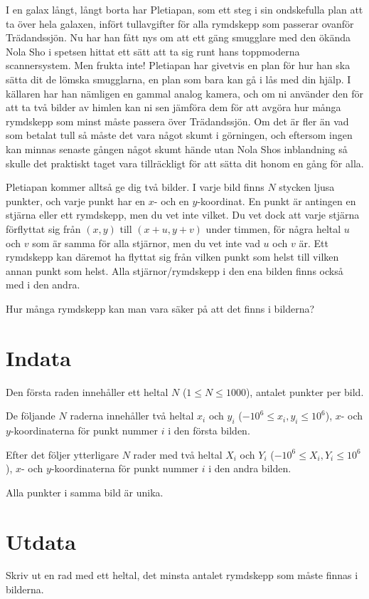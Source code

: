 I en galax långt, långt borta har Pletiapan, som ett steg i sin ondskefulla plan att ta över hela galaxen, infört tullavgifter för alla rymdskepp som passerar ovanför Trädandssjön.
Nu har han fått nys om att ett gäng smugglare med den ökända Nola Sho i spetsen hittat ett sätt att ta sig runt hans toppmoderna scannersystem.
Men frukta inte! Pletiapan har givetvis en plan för hur han ska sätta dit de lömska smugglarna, en plan som bara kan gå i lås med din hjälp.
I källaren har han nämligen en gammal analog kamera, och om ni använder den för att ta två bilder av himlen kan ni sen jämföra dem för att avgöra hur många rymdskepp som minst måste passera över Trädandssjön.
Om det är fler än vad som betalat tull så måste det vara något skumt i görningen, och eftersom ingen kan minnas senaste gången något skumt hände utan Nola Shos inblandning så skulle det praktiskt taget vara tillräckligt för att sätta dit honom en gång för alla.

Pletiapan kommer alltså ge dig två bilder. I varje bild finns $N$ stycken ljusa punkter, och varje punkt har en $x$- och en $y$-koordinat.
En punkt är antingen en stjärna eller ett rymdskepp, men du vet inte vilket.
Du vet dock att varje stjärna förflyttat sig från $(x, y)$ till $(x + u, y + v)$ under timmen, för några heltal $u$ och $v$ som är samma för alla stjärnor, men du vet inte vad $u$ och $v$ är.
Ett rymdskepp kan däremot ha flyttat sig från vilken punkt som helst till vilken annan punkt
som helst. Alla stjärnor/rymdskepp i den ena bilden finns också med i den andra.

Hur många rymdskepp kan man vara säker på att det finns i bilderna?

\section*{Indata}
Den första raden innehåller ett heltal $N$ ($1 \leq N \leq 1000$), antalet punkter per bild.

De följande $N$ raderna innehåller två heltal $x_i$ och $y_i$ ($-10^6 \leq x_i, y_i \leq 10^6$), $x$- och $y$-koordinaterna för punkt nummer $i$ i den första bilden.

Efter det följer ytterligare $N$ rader med två heltal $X_i$ och $Y_i$ ($-10^6 \leq X_i, Y_i \leq 10^6$), $x$- och $y$-koordinaterna för punkt nummer $i$ i den andra bilden.

Alla punkter i samma bild är unika.

\section*{Utdata}
Skriv ut en rad med ett heltal, det minsta antalet rymdskepp som måste finnas i bilderna.

